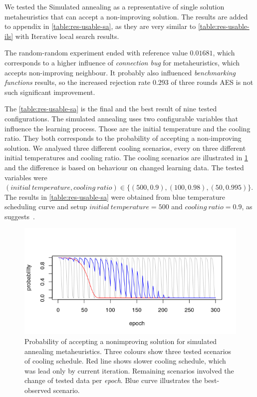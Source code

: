 \documentclass[
  print, %
  Table,   %
  nolof,     %
  nolot,     %
  11pt, %
  oneside  %
]{fithesis3}
\begin{document}
We tested the Simulated annealing as a representative of single solution metaheuristics that can accept a non-improving solution. The results are added to appendix in \cref{table:res-usable-sa}, as they are very similar to \cref{table:res-usable-ils} with Iterative local search results.

The random-random experiment ended with reference value $0.01681$, which corresponds to a higher influence of \textit{connection bug} for metaheuristics, which accepts non-improving neighbour. It probably also influenced \textit{benchmarking functions} results, so the increased rejection rate 0.293 of three rounds AES is not such significant improvement.

The \cref{table:res-usable-sa} is the final and the best result of nine tested configurations. The simulated annealing uses two configurable variables that influence the learning process. Those are the initial temperature and the cooling ratio. They both corresponds to the probability of accepting a non-improving solution. We analysed three different cooling scenarios, every on three different initial temperatures and cooling ratio. The cooling scenarios are illustrated in \cref{fig:sa-cooling-scenarios} and the difference is based on behaviour on changed learning data. The tested variables were $(\mathit{initial~temperature, cooling~ratio}) \in \{ (500, 0.9), (100, 0.98), (50, 0.995) \}$. The results in \cref{table:res-usable-sa} were obtained from blue temperature scheduling curve and setup $\mathit{initial~temperature} = 500$ and $\mathit{cooling~ratio} = 0.9$, as suggests~\cite{talbi2009metaheuristics}.

\begin{figure}
\centering
    \includegraphics[width=\textwidth]{./graphics/sa_prob.png}
    \caption{Probability of accepting a nonimproving solution for simulated annealing metaheuristics. Three colours show three tested scenarios of cooling schedule. Red line shows slower cooling schedule, which was lead only by current iteration. Remaining scenarios involved the change of tested data per \textit{epoch}. Blue curve illustrates the best-observed scenario.}
\label{fig:sa-cooling-scenarios}
\end{figure}
\end{document}
